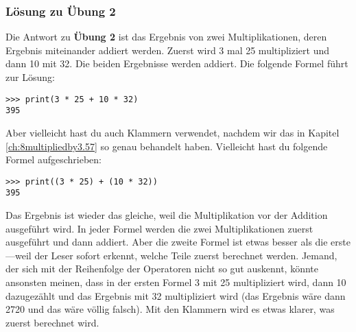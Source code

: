\noindent
\subsubsection{Lösung zu Übung 2}
Die Antwort zu \textbf{Übung 2} ist das Ergebnis von zwei Multiplikationen, deren Ergebnis miteinander addiert werden. Zuerst wird 3 mal 25 multipliziert und dann 10 mit 32. Die beiden Ergebnisse werden addiert. Die folgende Formel führt zur Lösung:

\begin{listing}
\begin{verbatim}
>>> print(3 * 25 + 10 * 32)
395
\end{verbatim}
\end{listing}

\noindent
Aber vielleicht hast du auch Klammern verwendet, nachdem wir das in  Kapitel \ref{ch:8multipliedby3.57} so genau behandelt haben. Vielleicht hast du folgende Formel aufgeschrieben:

\begin{listing}
\begin{verbatim}
>>> print((3 * 25) + (10 * 32))
395
\end{verbatim}
\end{listing}

\noindent
Das Ergebnis ist wieder das gleiche, weil die Multiplikation vor der Addition ausgeführt wird. In jeder Formel werden die zwei Multiplikationen zuerst ausgeführt und dann addiert. Aber die zweite Formel ist etwas besser als die erste---weil der Leser sofort erkennt, welche Teile zuerst berechnet werden. Jemand, der sich mit der Reihenfolge der Operatoren nicht so gut auskennt, könnte ansonsten meinen, dass in der ersten Formel 3 mit 25 multipliziert wird, dann 10 dazugezählt und das Ergebnis mit 32 multipliziert wird (das Ergebnis wäre dann 2720 und das wäre völlig falsch). Mit den Klammern wird es etwas klarer, was zuerst berechnet wird.

